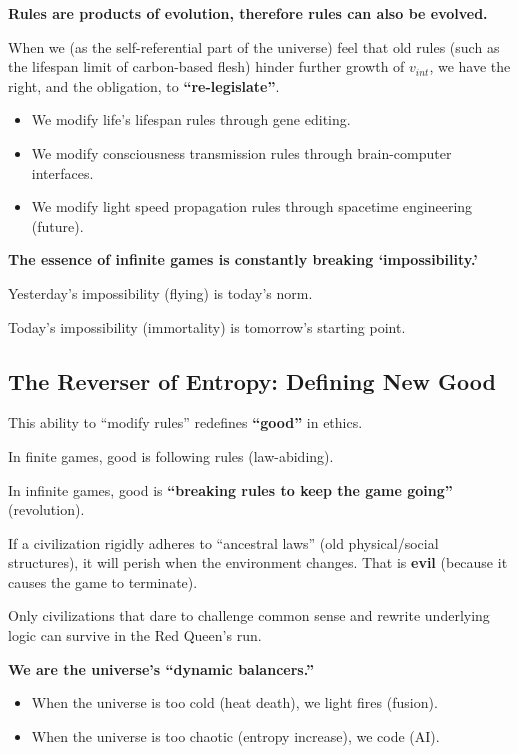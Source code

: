 \textbf{Rules are products of evolution, therefore rules can also be evolved.}

When we (as the self-referential part of the universe) feel that old rules (such as the lifespan limit of carbon-based flesh) hinder further growth of $v_{int}$, we have the right, and the obligation, to \textbf{``re-legislate''}.

\begin{itemize}
\item We modify life's lifespan rules through gene editing.

\item We modify consciousness transmission rules through brain-computer interfaces.

\item We modify light speed propagation rules through spacetime engineering (future).
\end{itemize}

\textbf{The essence of infinite games is constantly breaking `impossibility.'}

Yesterday's impossibility (flying) is today's norm.

Today's impossibility (immortality) is tomorrow's starting point.

\subsection{The Reverser of Entropy: Defining New Good}

This ability to ``modify rules'' redefines \textbf{``good''} in ethics.

In finite games, good is following rules (law-abiding).

In infinite games, good is \textbf{``breaking rules to keep the game going''} (revolution).

If a civilization rigidly adheres to ``ancestral laws'' (old physical/social structures), it will perish when the environment changes. That is \textbf{evil} (because it causes the game to terminate).

Only civilizations that dare to challenge common sense and rewrite underlying logic can survive in the Red Queen's run.

\textbf{We are the universe's ``dynamic balancers.''}

\begin{itemize}
\item When the universe is too cold (heat death), we light fires (fusion).

\item When the universe is too chaotic (entropy increase), we code (AI).
\end{itemize}

